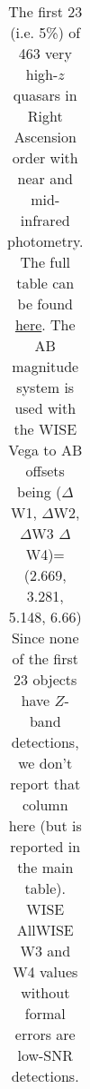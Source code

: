 \begin{table}
\begin{tabular}{llrrc cccc cccc}
    \hline
    \hline
    \end{tabular}
    \caption{The first 23 (i.e. 5\%) of 463 very high-$z$ quasars in Right Ascension order with near and mid-infrared photometry.
                  The full table can be found \href{https://github.com/d80b2t/VHzQ/tree/master/data}{here}.
                  The AB magnitude system is used with the WISE Vega to AB offsets being ($\Delta$W1, $\Delta$W2, $\Delta$W3 $\Delta$W4)=(2.669, 3.281, 5.148, 6.66)
                  Since none of the first 23 objects have $Z$-band detections, we don't report that column here (but is reported in the main table).
                  WISE AllWISE W3 and W4 values without formal errors are low-SNR detections. } 
     \label{tab:output_table}
     \end{table}
     
